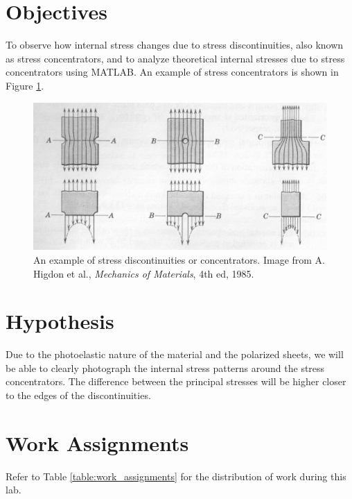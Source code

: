 \documentclass[12 pt]{article}
\begin{document}
\section{Objectives} \label{objectives}
To observe how internal stress changes due to stress discontinuities, also known as stress concentrators, and to analyze theoretical internal stresses due to stress concentrators using MATLAB. An example of stress concentrators is shown in Figure \ref{fig:stress_concentrators}.

\begin{figure}[htbp]
\centering
\includegraphics[width=6in]{images/Stress_Concentrators}
\caption{An example of stress discontinuities or concentrators. Image from A. Higdon et al., \textit{Mechanics of Materials}, 4th ed, 1985.}
\label{fig:stress_concentrators}
\end{figure}

\section{Hypothesis} \label{hypothesis}
Due to the photoelastic nature of the material and the polarized sheets, we will be able to clearly photograph the internal stress patterns around the stress concentrators. The difference between the principal stresses will be higher closer to the edges of the discontinuities.

\section{Work Assignments} \label{work_assignments}
Refer to Table \ref{table:work_assignments} for the distribution of work during this lab.
\end{document}
